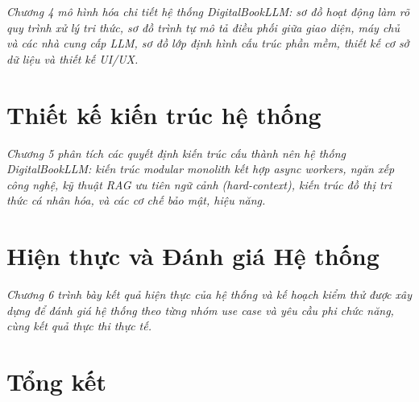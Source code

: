 \documentclass[12pt]{report}
\begin{document}
\textit{Chương 4 mô hình hóa chi tiết hệ thống DigitalBookLLM: sơ đồ hoạt động làm rõ quy trình xử lý tri thức, sơ đồ trình tự mô tả điều phối giữa giao diện, máy chủ và các nhà cung cấp LLM, sơ đồ lớp định hình cấu trúc phần mềm, thiết kế cơ sở dữ liệu và thiết kế UI/UX.}













\chapter{Thiết kế kiến trúc hệ thống}

\textit{Chương 5 phân tích các quyết định kiến trúc cấu thành nên hệ thống DigitalBookLLM: kiến trúc modular monolith kết hợp async workers, ngăn xếp công nghệ, kỹ thuật RAG ưu tiên ngữ cảnh (hard-context), kiến trúc đồ thị tri thức cá nhân hóa, và các cơ chế bảo mật, hiệu năng.}











\chapter{Hiện thực và Đánh giá Hệ thống}

\textit{Chương 6 trình bày kết quả hiện thực của hệ thống và kế hoạch kiểm thử được xây dựng để đánh giá hệ thống theo từng nhóm use case và yêu cầu phi chức năng, cùng kết quả thực thi thực tế.}





\chapter{Tổng kết}




\appendix


\end{document}
